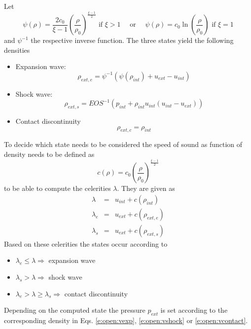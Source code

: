 Let
\begin{equation}
\psi(\rho) = \frac{2 c_0}{\xi - 1}\left( \frac{\rho}{\rho_0}
\right)^{\frac{\xi-1}{2}}\mbox{ if } \xi > 1 \quad \mbox{ or } \quad
\psi(\rho) = c_0 \ln\left( \frac{\rho}{\rho_0} \right) \mbox{ if } \xi =
1
\label{e:open:psi}
\end{equation}
and $\psi^{-1}$ the respective inverse function. The three states yield
the following densities
\begin{itemize}
  \item Expansion wave:
  \begin{equation}
  \rho_{ext,e} = \psi^{-1}(\psi(\rho_{int}) +
  u_{ext} - u_{int})
  \label{e:open:vexp}
  \end{equation}
  \item Shock wave:
  \begin{equation}
  \rho_{ext,s} = EOS^{-1}(p_{int} + \rho_{int}
  u_{int} (u_{int} - u_{ext}))
  \label{e:open:vshock}
  \end{equation}
  \item Contact discontinuity
  \begin{equation}
  \rho_{ext,c} = \rho_{int}
  \label{e:open:vcontact}
  \end{equation}
\end{itemize}
To decide which state needs to be considered the speed of sound as
function of density needs to be defined as
\begin{equation}
c(\rho) = c_0 \left( \frac{\rho}{\rho_0} \right)^{\frac{\xi - 1}{2}}
\label{e:open:speedofsound}
\end{equation}
to be able to compute the celerities $\lambda$. They are given as
\begin{eqnarray}
\lambda &=& u_{int} + c(\rho_{int})
\label{e:open:lambda}
\\
\lambda_e &=& u_{ext} + c(\rho_{ext,e})
\label{e:open:vlambda_e}
\\
\lambda_s &=& u_{ext} + c(\rho_{ext,s})
\label{e:open:vlambda_s}
\end{eqnarray}
Based on these celerities the states occur according to
\begin{itemize}
  \item $\lambda_e \le \lambda \Rightarrow$ expansion wave
  \item $\lambda_s > \lambda \Rightarrow$ shock wave
  \item $\lambda_e > \lambda \ge \lambda_s \Rightarrow$ contact
  discontinuity
\end{itemize}
Depending on the computed state the pressure $p_{ext}$ is set according
to the corresponding density in Eqs. \eqref{e:open:vexp},
\eqref{e:open:vshock} or \eqref{e:open:vcontact}.


